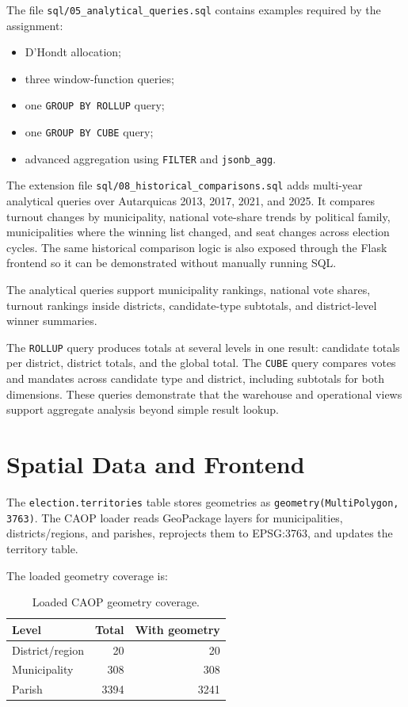 \documentclass[11pt,twocolumn]{article}
\begin{document}
The file \texttt{sql/05\_analytical\_queries.sql} contains examples required by the assignment:

\begin{itemize}
  \item D'Hondt allocation;
  \item three window-function queries;
  \item one \texttt{GROUP BY ROLLUP} query;
  \item one \texttt{GROUP BY CUBE} query;
  \item advanced aggregation using \texttt{FILTER} and \texttt{jsonb\_agg}.
\end{itemize}

The extension file \texttt{sql/08\_historical\_comparisons.sql} adds multi-year analytical queries over Autarquicas 2013, 2017, 2021, and 2025. It compares turnout changes by municipality, national vote-share trends by political family, municipalities where the winning list changed, and seat changes across election cycles. The same historical comparison logic is also exposed through the Flask frontend so it can be demonstrated without manually running SQL.

The analytical queries support municipality rankings, national vote shares, turnout rankings inside districts, candidate-type subtotals, and district-level winner summaries.

The \texttt{ROLLUP} query produces totals at several levels in one result: candidate totals per district, district totals, and the global total. The \texttt{CUBE} query compares votes and mandates across candidate type and district, including subtotals for both dimensions. These queries demonstrate that the warehouse and operational views support aggregate analysis beyond simple result lookup.

\section{Spatial Data and Frontend}

The \texttt{election.territories} table stores geometries as \texttt{geometry(MultiPolygon, 3763)}. The CAOP loader reads GeoPackage layers for municipalities, districts/regions, and parishes, reprojects them to EPSG:3763, and updates the territory table.

The loaded geometry coverage is:

\begin{table}[h]
\centering
\caption{Loaded CAOP geometry coverage.}
\begin{tabular}{lrr}
\toprule
Level & Total & With geometry\\
\midrule
District/region & 20 & 20\\
Municipality & 308 & 308\\
Parish & 3394 & 3241\\
\bottomrule
\end{tabular}
\end{table}
\end{document}
